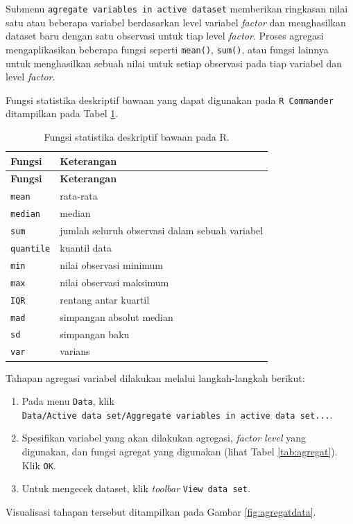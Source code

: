 \documentclass[12pt,]{krantz}
\providecommand{\tightlist}{%
  \setlength{\itemsep}{0pt}\setlength{\parskip}{0pt}}
\begin{document}
Submenu \texttt{agregate\ variables\ in\ active\ dataset} memberikan ringkasan nilai satu atau beberapa variabel berdasarkan level variabel \emph{factor} dan menghasilkan dataset baru dengan satu observasi untuk tiap level \emph{factor}. Proses agregasi mengaplikasikan beberapa fungsi seperti \texttt{mean()}, \texttt{sum()}, atau fungsi lainnya untuk menghasilkan sebuah nilai untuk setiap observasi pada tiap variabel dan level \emph{factor}.

Fungsi statistika deskriptif bawaan yang dapat digunakan pada \texttt{R\ Commander} ditampilkan pada Tabel \ref{tab:builtinfun}.

\begin{longtable}[]{@{}ll@{}}
\caption{\label{tab:builtinfun} Fungsi statistika deskriptif bawaan pada R.}\tabularnewline
\toprule
\textbf{Fungsi} & \textbf{Keterangan}\tabularnewline
\midrule
\endfirsthead
\toprule
\textbf{Fungsi} & \textbf{Keterangan}\tabularnewline
\midrule
\endhead
\texttt{mean} & rata-rata\tabularnewline
\texttt{median} & median\tabularnewline
\texttt{sum} & jumlah seluruh observasi dalam sebuah variabel\tabularnewline
\texttt{quantile} & kuantil data\tabularnewline
\texttt{min} & nilai observasi minimum\tabularnewline
\texttt{max} & nilai observasi maksimum\tabularnewline
\texttt{IQR} & rentang antar kuartil\tabularnewline
\texttt{mad} & simpangan absolut median\tabularnewline
\texttt{sd} & simpangan baku\tabularnewline
\texttt{var} & varians\tabularnewline
\bottomrule
\end{longtable}

Tahapan agregasi variabel dilakukan melalui langkah-langkah berikut:

\begin{enumerate}
\def\labelenumi{\arabic{enumi}.}
\tightlist
\item
  Pada menu \texttt{Data}, klik \texttt{Data/Active\ data\ set/Aggregate\ variables\ in\ active\ data\ set...}.
\item
  Spesifikan variabel yang akan dilakukan agregasi, \emph{factor level} yang digunakan, dan fungsi agregat yang digunakan (lihat Tabel \ref{tab:agregat}). Klik \texttt{OK}.
\item
  Untuk mengecek dataset, klik \emph{toolbar} \texttt{View\ data\ set}.
\end{enumerate}

Visualisasi tahapan tersebut ditampilkan pada Gambar \ref{fig:agregatdata}.
\end{document}
